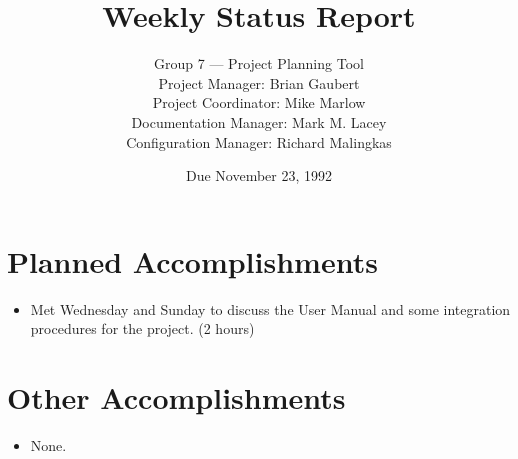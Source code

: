 


\title{Weekly Status Report}

\author{Group 7 --- Project Planning Tool\\
Project Manager: Brian Gaubert\\
Project Coordinator: Mike Marlow\\
Documentation Manager: Mark M. Lacey\\
Configuration Manager: Richard Malingkas}

\date{Due November 23, 1992}

\maketitle

%
%
%
\section{Planned Accomplishments}
\begin{itemize}
        \item Met Wednesday and Sunday to discuss the User Manual and some
              integration procedures for the project. (2 hours)
\end{itemize}

%
%
%
\section{Other Accomplishments}
\begin{itemize}
	\item None.
\end{itemize}

%
%
%

